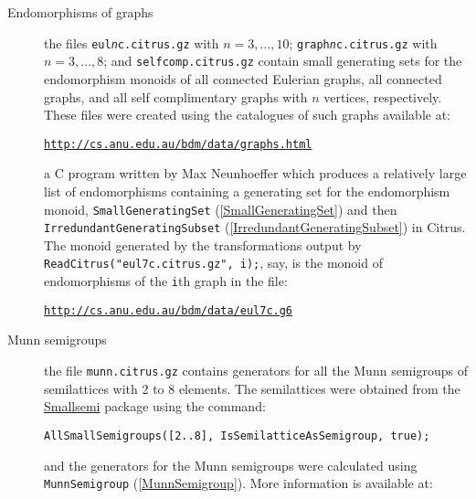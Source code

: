 \documentclass[a4paper,11pt]{report}
\begin{document}
{{ 
\begin{description}
\item[{Endomorphisms of graphs}]  the files \texttt{eul\mbox{\texttt{\mdseries\slshape n}}c.citrus.gz} with $n=3,...,10$; \texttt{graph\mbox{\texttt{\mdseries\slshape n}}c.citrus.gz} with $n=3,...,8$; and \texttt{selfcomp.citrus.gz} contain small generating sets for the endomorphism monoids of all connected
Eulerian graphs, all connected graphs, and all self complimentary graphs with $n$ vertices, respectively. These files were created using the catalogues of such
graphs available at:

 \href{http://cs.anu.edu.au/~bdm/data/graphs.html} {\texttt{http://cs.anu.edu.au/\texttt{}bdm/data/graphs.html}}

 a C program written by Max Neunhoeffer which produces a relatively large list
of endomorphisms containing a generating set for the endomorphism monoid, \texttt{SmallGeneratingSet} (\ref{SmallGeneratingSet}) and then \texttt{IrredundantGeneratingSubset} (\ref{IrredundantGeneratingSubset}) in \textsf{Citrus}. The monoid generated by the transformations output by \texttt{ReadCitrus("eul7c.citrus.gz", i);}, say, is the monoid of endomorphisms of the \texttt{i}th graph in the file:

 \href{http://cs.anu.edu.au/~bdm/data/eul7c.g6} {\texttt{http://cs.anu.edu.au/\texttt{}bdm/data/eul7c.g6}} 
\item[{Munn semigroups}]  the file \texttt{munn.citrus.gz} contains generators for all the Munn semigroups of semilattices with 2 to 8
elements. The semilattices were obtained from the \href{http://www-history.mcs.st-and.ac.uk/~jamesm/smallsemi/index.html} {Smallsemi} package using the command: 
\begin{Verbatim}[commandchars=!@|,fontsize=\small,frame=single,label=Example]
  AllSmallSemigroups([2..8], IsSemilatticeAsSemigroup, true);
\end{Verbatim}
 and the generators for the Munn semigroups were calculated using \texttt{MunnSemigroup} (\ref{MunnSemigroup}). More information is available at:


\end{description}}}
\end{document}
